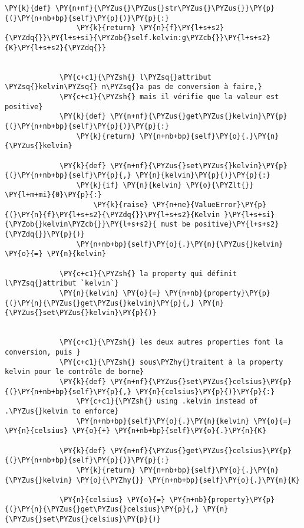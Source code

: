 \begin{Verbatim}[commandchars=\\\{\}]
             \PY{k}{def} \PY{n+nf}{\PYZus{}\PYZus{}str\PYZus{}\PYZus{}}\PY{p}{(}\PY{n+nb+bp}{self}\PY{p}{)}\PY{p}{:}
                 \PY{k}{return} \PY{n}{f}\PY{l+s+s2}{\PYZdq{}}\PY{l+s+si}{\PYZob{}self.kelvin:g\PYZcb{}}\PY{l+s+s2}{K}\PY{l+s+s2}{\PYZdq{}}
         
         
             \PY{c+c1}{\PYZsh{} l\PYZsq{}attribut \PYZsq{}kelvin\PYZsq{} n\PYZsq{}a pas de conversion à faire,}
             \PY{c+c1}{\PYZsh{} mais il vérifie que la valeur est positive}
             \PY{k}{def} \PY{n+nf}{\PYZus{}get\PYZus{}kelvin}\PY{p}{(}\PY{n+nb+bp}{self}\PY{p}{)}\PY{p}{:}
                 \PY{k}{return} \PY{n+nb+bp}{self}\PY{o}{.}\PY{n}{\PYZus{}kelvin}
         
             \PY{k}{def} \PY{n+nf}{\PYZus{}set\PYZus{}kelvin}\PY{p}{(}\PY{n+nb+bp}{self}\PY{p}{,} \PY{n}{kelvin}\PY{p}{)}\PY{p}{:}
                 \PY{k}{if} \PY{n}{kelvin} \PY{o}{\PYZlt{}} \PY{l+m+mi}{0}\PY{p}{:}
                     \PY{k}{raise} \PY{n+ne}{ValueError}\PY{p}{(}\PY{n}{f}\PY{l+s+s2}{\PYZdq{}}\PY{l+s+s2}{Kelvin }\PY{l+s+si}{\PYZob{}kelvin\PYZcb{}}\PY{l+s+s2}{ must be positive}\PY{l+s+s2}{\PYZdq{}}\PY{p}{)}
                 \PY{n+nb+bp}{self}\PY{o}{.}\PY{n}{\PYZus{}kelvin} \PY{o}{=} \PY{n}{kelvin}
         
             \PY{c+c1}{\PYZsh{} la property qui définit l\PYZsq{}attribut `kelvin`}
             \PY{n}{kelvin} \PY{o}{=} \PY{n+nb}{property}\PY{p}{(}\PY{n}{\PYZus{}get\PYZus{}kelvin}\PY{p}{,} \PY{n}{\PYZus{}set\PYZus{}kelvin}\PY{p}{)}
         
         
             \PY{c+c1}{\PYZsh{} les deux autres properties font la conversion, puis }
             \PY{c+c1}{\PYZsh{} sous\PYZhy{}traitent à la property kelvin pour le contrôle de borne}
             \PY{k}{def} \PY{n+nf}{\PYZus{}set\PYZus{}celsius}\PY{p}{(}\PY{n+nb+bp}{self}\PY{p}{,} \PY{n}{celsius}\PY{p}{)}\PY{p}{:}
                 \PY{c+c1}{\PYZsh{} using .kelvin instead of .\PYZus{}kelvin to enforce}
                 \PY{n+nb+bp}{self}\PY{o}{.}\PY{n}{kelvin} \PY{o}{=} \PY{n}{celsius} \PY{o}{+} \PY{n+nb+bp}{self}\PY{o}{.}\PY{n}{K}
         
             \PY{k}{def} \PY{n+nf}{\PYZus{}get\PYZus{}celsius}\PY{p}{(}\PY{n+nb+bp}{self}\PY{p}{)}\PY{p}{:}
                 \PY{k}{return} \PY{n+nb+bp}{self}\PY{o}{.}\PY{n}{\PYZus{}kelvin} \PY{o}{\PYZhy{}} \PY{n+nb+bp}{self}\PY{o}{.}\PY{n}{K}
             
             \PY{n}{celsius} \PY{o}{=} \PY{n+nb}{property}\PY{p}{(}\PY{n}{\PYZus{}get\PYZus{}celsius}\PY{p}{,} \PY{n}{\PYZus{}set\PYZus{}celsius}\PY{p}{)}
         

\end{Verbatim}
